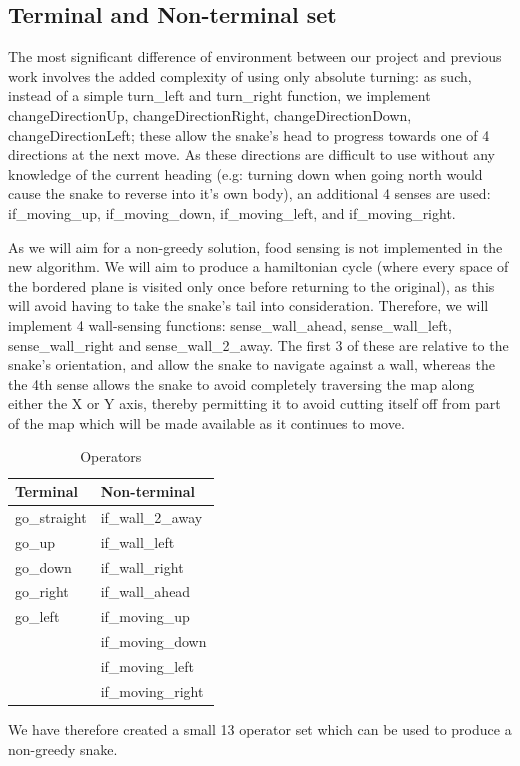 \documentclass[british,10pt,a4paper]{article}
\begin{document}
\subsection{Terminal and Non-terminal set}
\label{subsec:design_terminals}
The most significant difference of environment between our project and previous work involves the added complexity of using only absolute turning: as such, instead of a simple turn\_left and turn\_right function, we implement changeDirectionUp, changeDirectionRight, changeDirectionDown, changeDirectionLeft; these allow the snake's head to progress towards one of 4 directions at the next move. As these directions are difficult to use without any knowledge of the current heading (e.g: turning down when going north would cause the snake to reverse into it's own body), an additional 4 senses are used: if\_moving\_up, if\_moving\_down, if\_moving\_left, and if\_moving\_right. \newline

As we will aim for a non-greedy solution, food sensing is not implemented in the new algorithm. We will aim to produce a hamiltonian cycle (where every space of the bordered plane is visited only once before returning to the original), as this will avoid having to take the snake's tail into consideration. Therefore, we will implement 4 wall-sensing functions: sense\_wall\_ahead, sense\_wall\_left, sense\_wall\_right and sense\_wall\_2\_away. The first 3 of these are relative to the snake's orientation, and allow the snake to navigate against a wall, whereas the the 4th sense allows the snake to avoid completely traversing the map along either the X or Y axis, thereby permitting it to avoid cutting itself off from part of the map which will be made available as it continues to move. \newline
\begin{table}[]
\centering
\caption{Operators}
\label{tab:operators}
\begin{tabular}{|l|l|}
\hline
\textbf{Terminal} & \textbf{Non-terminal} \\ \hline
go\_straight      & if\_wall\_2\_away     \\ \hline
go\_up            & if\_wall\_left        \\ \hline
go\_down          & if\_wall\_right       \\ \hline
go\_right         & if\_wall\_ahead       \\ \hline
go\_left          & if\_moving\_up        \\ \hline
                  & if\_moving\_down      \\ \hline
                  & if\_moving\_left      \\ \hline
                  & if\_moving\_right     \\ \hline
\end{tabular}
\end{table}
We have therefore created a small 13 operator set which can be used to produce a non-greedy snake.
\end{document}
